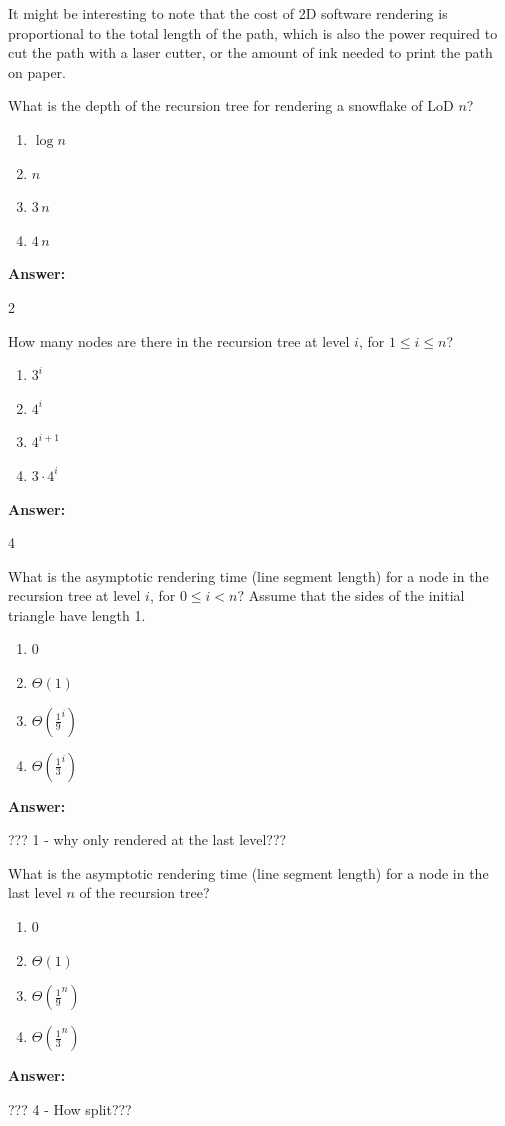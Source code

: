 \documentclass[12pt,twoside]{article}
\newcommand{\answer}{
 \par\medskip
 \textbf{Answer:}
}
\newcommand{\answerIm}{ \answer
2
}
\newcommand{\answerIn}{ \answer
4
}
\newcommand{\answerIo}{ \answer
??? 1 - why only rendered at the last level??? 
}
\newcommand{\answerIp}{ \answer
??? 4 - How split???
}
\begin{document}
\begin{problems}
It might be interesting to note that the cost of 2D software rendering is
proportional to the total length of the path, which is also the power required
to cut the path with a laser cutter, or the amount of ink needed to print the
path on paper.

\begin{problemparts}
  \problempart {} What is the depth of the recursion tree for rendering a
  snowflake of LoD $n$?
    \begin{enumerate}
      \item $\log n$
      \item $n$
      \item $3 \, n$
      \item $4 \, n$
    \end{enumerate}
\answerIm

  \problempart {} How many nodes are there in the recursion tree at level
  $i$, for $1 \le i \le n$?
    \begin{enumerate}
      \item $3 ^ i$
      \item $4 ^ i$
      \item $4 ^ {i + 1}$
      \item $3 \cdot 4 ^ i$
    \end{enumerate}
\answerIn

  \problempart {} What is the asymptotic rendering time (line segment length)
  for a node in the recursion tree at level $i$, for $0 \le i < n$? Assume that
  the sides of the initial triangle have length 1.
    \begin{enumerate}
      \item $0$
      \item $\Theta(1)$
      \item $\Theta(\frac{1}{9}^i)$
      \item $\Theta(\frac{1}{3}^i)$
    \end{enumerate}
\answerIo

  \problempart {} What is the asymptotic rendering time (line segment length)
  for a node in the last level $n$ of the recursion tree?
    \begin{enumerate}
      \item $0$
      \item $\Theta(1)$
      \item $\Theta(\frac{1}{9}^n)$
      \item $\Theta(\frac{1}{3}^n)$
    \end{enumerate}
\answerIp


\end{problemparts}
\end{problems}
\end{document}
